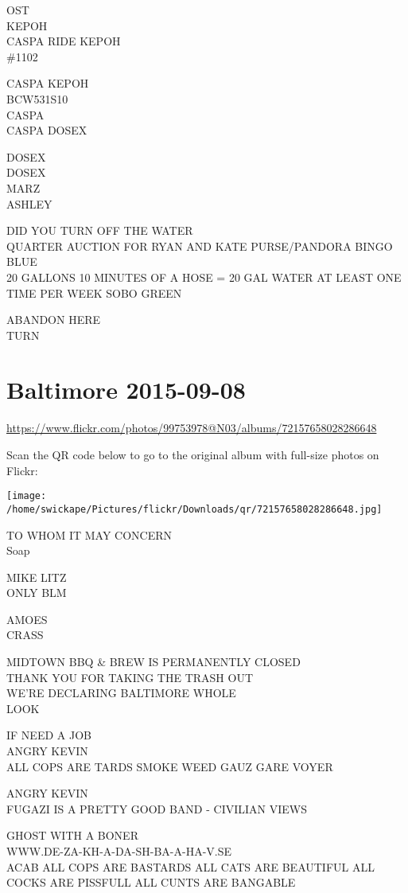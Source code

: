 \documentclass[10pt,letterpaper]{article}
\begin{document}
OST\\
KEPOH\\
CASPA RIDE KEPOH\\
\#1102

CASPA KEPOH\\
BCW531S10\\
CASPA\\
CASPA DOSEX

DOSEX\\
DOSEX\\
MARZ\\
ASHLEY

DID YOU TURN OFF THE WATER\\
QUARTER AUCTION FOR RYAN AND KATE PURSE/PANDORA BINGO\\
BLUE\\
20 GALLONS 10 MINUTES OF A HOSE = 20 GAL WATER AT LEAST ONE TIME PER WEEK SOBO GREEN

ABANDON HERE\\
TURN


\section*{Baltimore 2015-09-08}

\url{https://www.flickr.com/photos/99753978@N03/albums/72157658028286648}

Scan the QR code below to go to the original album with full-size photos on Flickr:

\texttt{[image: /home/swickape/Pictures/flickr/Downloads/qr/72157658028286648.jpg]}


TO WHOM IT MAY CONCERN\\
Soap

MIKE LITZ\\
ONLY BLM

AMOES\\
CRASS

MIDTOWN BBQ \& BREW IS PERMANENTLY CLOSED\\
THANK YOU FOR TAKING THE TRASH OUT\\
WE'RE DECLARING BALTIMORE WHOLE\\
LOOK

IF NEED A JOB\\
ANGRY KEVIN\\
ALL COPS ARE TARDS SMOKE WEED GAUZ GARE VOYER

ANGRY KEVIN\\
FUGAZI IS A PRETTY GOOD BAND {-} CIVILIAN VIEWS

GHOST WITH A BONER\\
WWW.DE{-}ZA{-}KH{-}A{-}DA{-}SH{-}BA{-}A{-}HA{-}V.SE\\
ACAB ALL COPS ARE BASTARDS ALL CATS ARE BEAUTIFUL ALL COCKS ARE PISSFULL ALL CUNTS ARE BANGABLE
\end{document}
